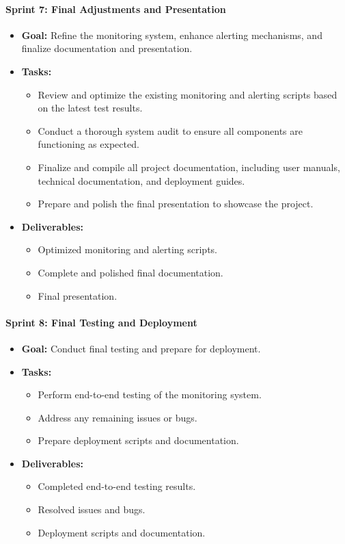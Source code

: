 \documentclass[11pt,a4paper]{article}
\begin{document}
    \paragraph{Sprint 7: Final Adjustments and Presentation}
    \begin{itemize}
        \item \textbf{Goal:} Refine the monitoring system, enhance alerting mechanisms, and finalize documentation and presentation.
        \item \textbf{Tasks:}
        \begin{itemize}
            \item Review and optimize the existing monitoring and alerting scripts based on the latest test results.
            \item Conduct a thorough system audit to ensure all components are functioning as expected.
            \item Finalize and compile all project documentation, including user manuals, technical documentation, and deployment guides.
            \item Prepare and polish the final presentation to showcase the project.
        \end{itemize}
        \item \textbf{Deliverables:}
        \begin{itemize}
            \item Optimized monitoring and alerting scripts.
            \item Complete and polished final documentation.
            \item Final presentation.
        \end{itemize}
    \end{itemize}

    \paragraph{Sprint 8: Final Testing and Deployment}
    \begin{itemize}
        \item \textbf{Goal:} Conduct final testing and prepare for deployment.
        \item \textbf{Tasks:}
        \begin{itemize}
            \item Perform end-to-end testing of the monitoring system.
            \item Address any remaining issues or bugs.
            \item Prepare deployment scripts and documentation.
        \end{itemize}
        \item \textbf{Deliverables:}
        \begin{itemize}
            \item Completed end-to-end testing results.
            \item Resolved issues and bugs.
            \item Deployment scripts and documentation.
        \end{itemize}
    \end{itemize}
\end{document}
